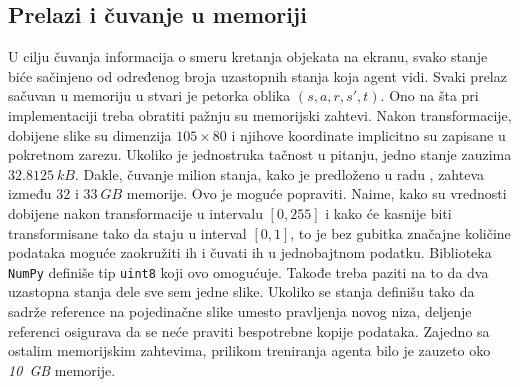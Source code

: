 \subsection{Prelazi i čuvanje u memoriji}

U cilju čuvanja informacija o smeru kretanja objekata na ekranu, svako stanje biće sačinjeno od određenog broja uzastopnih stanja koja agent vidi. Svaki prelaz sačuvan u memoriju u stvari je petorka oblika $(s, a, r, s', t)$. 
Ono na šta pri implementaciji treba obratiti pažnju su memorijski zahtevi. Nakon transformacije, dobijene slike su dimenzija $105 \times 80$ i njihove koordinate implicitno su zapisane u pokretnom zarezu. Ukoliko je jednostruka tačnost u pitanju, jedno stanje zauzima $32.8125~kB$. Dakle, čuvanje milion stanja, kako je predloženo u radu \cite{dqn_dm}, zahteva između $32$ i $33~GB$ memorije. Ovo je moguće popraviti. Naime, kako su vrednosti dobijene nakon transformacije u intervalu $[0, 255]$ i kako će kasnije biti transformisane tako da staju u interval $[0, 1]$, to je bez gubitka značajne količine podataka moguće zaokružiti ih i čuvati ih u jednobajtnom podatku. Biblioteka \texttt{NumPy} definiše tip \texttt{uint8} koji ovo omogućuje. Takođe treba paziti na to da dva uzastopna stanja dele sve sem jedne slike. Ukoliko se stanja definišu tako da sadrže reference na pojedinačne slike umesto pravljenja novog niza, deljenje referenci osigurava da se neće praviti bespotrebne kopije podataka. Zajedno sa ostalim memorijskim zahtevima, prilikom treniranja agenta bilo je zauzeto oko {\em 10~GB} memorije.

